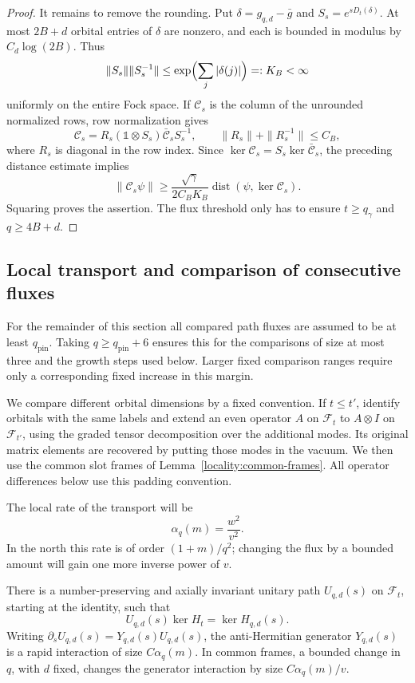 \begin{proof}
It remains to remove the rounding.  Put $\delta=g_{q,d}-\bar g$ and
$S_s=e^{sD_t(\delta)}$.  At most $2B+d$ orbital entries of $\delta$ are
nonzero, and each is bounded in modulus by $C_d\log(2B)$.  Thus
\[
 \|S_s\|\|S_s^{-1}\|
 \le\exp\Bigl(\sum_j|\delta(j)|\Bigr)=:K_B<\infty
\]
uniformly on the entire Fock space.  If $\mathcal C_s$ is the column of
the unrounded normalized rows, row normalization gives
\[
 \mathcal C_s=R_s(\mathbb 1\otimes S_s)
                 \bar{\mathcal C}_s S_s^{-1},
 \qquad \|R_s\|+\|R_s^{-1}\|\le C_B,
\]
where $R_s$ is diagonal in the row index.  Since
$\ker\mathcal C_s=S_s\ker\bar{\mathcal C}_s$, the preceding distance
estimate implies
\[
 \|\mathcal C_s\psi\|
 \ge \frac{\sqrt\gamma}{2C_BK_B}
             \operatorname{dist}(\psi,\ker\mathcal C_s).
\]
Squaring proves the assertion.  The flux threshold only has to ensure
$t\ge q_\gamma$ and $q\ge4B+d$.
\end{proof}

\subsection{Local transport and comparison of consecutive fluxes}

For the remainder of this section all compared path fluxes are assumed
to be at least $q_{\mathrm{pin}}$.  Taking $q\ge q_{\mathrm{pin}}+6$
ensures this for the comparisons of size at most three and the growth
steps used below.  Larger fixed comparison ranges require only a
corresponding fixed increase in this margin.

We compare different orbital dimensions by a fixed convention.  If
$t\le t'$, identify orbitals with the same labels and extend an even
operator $A$ on $\mathcal F_t$ to $A\otimes I$ on $\mathcal F_{t'}$,
using the graded tensor decomposition over the additional modes.  Its original
matrix elements are recovered by putting those modes in the vacuum.
We then use the common slot frames of
Lemma~\ref{locality:common-frames}.  All operator differences below use
this padding convention.

The local rate of the transport will be
\begin{equation}
 \alpha_q(m)=\frac{w^2}{v^2}.
 \label{eq:pinning-alpha}
\end{equation}
In the north this rate is of order $(1+m)/q^2$; changing the flux by a
bounded amount will gain one more inverse power of $v$.

\begin{proposition}
\label{pinning:generator}
There is a number-preserving and axially invariant unitary path
$U_{q,d}(s)$ on $\mathcal F_t$, starting at the identity, such that
\[
 U_{q,d}(s)\ker H_t=\ker H_{q,d}(s).
\]
Writing $\partial_sU_{q,d}(s)=Y_{q,d}(s)U_{q,d}(s)$, the anti-Hermitian
generator $Y_{q,d}(s)$ is a rapid interaction of size $C\alpha_q(m)$.
In common frames, a bounded change in $q$, with $d$ fixed, changes the
generator interaction by size $C\alpha_q(m)/v$.
\end{proposition}

